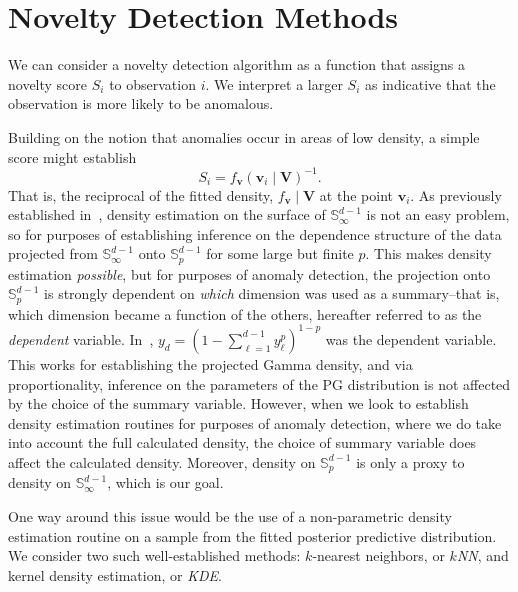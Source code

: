\section{Novelty Detection Methods\label{sec:novelty}}
We can consider a novelty detection algorithm as a function that assigns a
  novelty score $S_i$ to observation $i$.  We interpret a larger $S_i$
  as indicative that the observation is more likely to be anomalous.

Building on the notion that anomalies occur in areas of low density, a simple
  score might establish
  \[
      S_i = f_{\bm{v}}(\bm{v}_i\mid \bm{V})^{-1}.  
  \]
  That is, the reciprocal of the fitted density, $f_{\bm{v}}\mid \bm{V}$ at the 
  point $\bm{v}_i$.
  As previously established in~\cite{trubey:pg}, density estimation on the 
  surface of ${\mathbb S}_{\infty}^{d-1}$ is not an easy problem, so for 
  purposes of establishing inference on the dependence structure of the data 
  projected from ${\mathbb S}_{\infty}^{d-1}$ onto ${\mathbb S}_p^{d-1}$ for 
  some large but finite $p$.  This makes density estimation \emph{possible}, but 
  for purposes of anomaly detection, the projection onto ${\mathbb S}_p^{d-1}$ is 
  strongly dependent on \emph{which} dimension was used as a summary--that is, 
  which dimension became a function of the others, hereafter referred to as the 
  \emph{dependent} variable. In~\cite{trubey:pg}, 
  $y_d = (1 - \sum_{\ell = 1}^{d-1}y_{\ell}^p)^{1-p}$ was the dependent variable.
  This works for establishing the projected Gamma density, and via 
  proportionality, inference on the parameters of the PG distribution is not affected
  by the choice of the summary variable. However, when we look to establish 
  density estimation routines for purposes of anomaly detection, where we do 
  take into account the full calculated density, the choice of summary variable 
  does affect the calculated density.  Moreover, density on $\mathbb{S}_p^{d-1}$
  is only a proxy to density on $\mathbb{S}_{\infty}^{d-1}$, which is our goal.


One way around this issue would be the use of a non-parametric density estimation
  routine on a sample from the fitted posterior predictive distribution.  We 
  consider two such well-established methods: 
  $k$-nearest neighbors, or \emph{$k$NN}, 
  and kernel density estimation, or \emph{KDE}.

